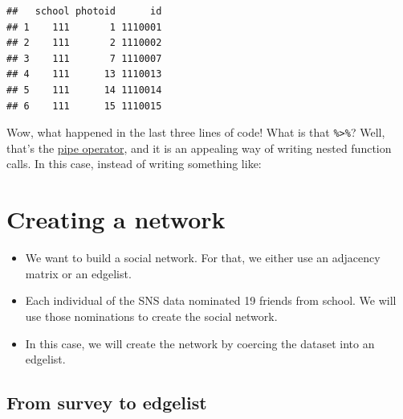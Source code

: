 \documentclass[
]{book}
\newenvironment{Shaded}{\begin{snugshade}}{\end{snugshade}}
\newcommand{\AttributeTok}[1]{\textcolor[rgb]{0.13,0.29,0.53}{#1}}
\newcommand{\DecValTok}[1]{\textcolor[rgb]{0.00,0.00,0.81}{#1}}
\newcommand{\FunctionTok}[1]{\textcolor[rgb]{0.13,0.29,0.53}{\textbf{#1}}}
\newcommand{\NormalTok}[1]{#1}
\newcommand{\OtherTok}[1]{\textcolor[rgb]{0.56,0.35,0.01}{#1}}
\newcommand{\SpecialCharTok}[1]{\textcolor[rgb]{0.81,0.36,0.00}{\textbf{#1}}}
\begin{document}
\begin{verbatim}
##   school photoid      id
## 1    111       1 1110001
## 2    111       2 1110002
## 3    111       7 1110007
## 4    111      13 1110013
## 5    111      14 1110014
## 6    111      15 1110015
\end{verbatim}

Wow, what happened in the last three lines of code! What is that \texttt{\%\textgreater{}\%}? Well, that's the \href{http://r4ds.had.co.nz/pipes.html}{pipe operator}, and it is an appealing way of writing nested function calls. In this case, instead of writing something like:

\begin{Shaded}
\end{Shaded}

\hypertarget{creating-a-network}{%
\section{Creating a network}\label{creating-a-network}}

\begin{itemize}
\item
  We want to build a social network. For that, we either use an adjacency matrix or an edgelist.
\item
  Each individual of the SNS data nominated 19 friends from school. We will use those nominations to create the social network.
\item
  In this case, we will create the network by coercing the dataset into an edgelist.
\end{itemize}

\hypertarget{from-survey-to-edgelist}{%
\subsection{From survey to edgelist}\label{from-survey-to-edgelist}}
\end{document}
